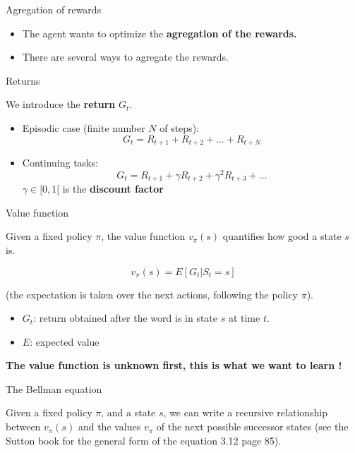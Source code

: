 \documentclass[usenames,dvipsnames,french]{beamer}
\begin{document}
\begin{frame}{Agregation of rewards}
   \begin{itemize}
       \item The agent wants to optimize the \textbf{{agregation of the rewards.}} 
	\item There are several ways to agregate the rewards.
   \end{itemize} 
\end{frame}

\begin{frame}{Returns}

    We introduce the \textbf{return} $G_t$.

    \begin{itemize}
	\item Episodic case (finite number $N$ of steps):
	    \begin{equation}
		G_t = R_{t+1} + R_{t+2} + \dots + R_{t+N}
	    \end{equation}
	\item Continuing tasks:
	    \begin{equation}
		G_t = R_{t+1} + \gamma R_{t+2} + \gamma^2 R_{t+3} + \dots 
	    \end{equation}
	    $\gamma \in [0,1[$ is the \textbf{{discount factor}}
    \end{itemize}

\end{frame}

\begin{frame}{Value function}

    Given a fixed policy $\pi$, the value function $v_{\pi}(s)$ quantifies how good a state $s$ is.

    \begin{equation}
	v_{\pi}(s) = E[G_t|S_t=s]
    \end{equation}

    (the expectation is taken over the next actions, following the policy $\pi$).
    \begin{itemize}
        \item $G_t$: return obtained after the word is in state $s$ at time $t$.
	\item $E$: expected value
    \end{itemize}

    \textbf{The value function is unknown first, this is what we want to learn !}

\end{frame}

\begin{frame}{The Bellman equation}

    Given a fixed policy $\pi$, and a state $s$, we can write a recursive relationship between 
    $v_{\pi}(s)$ and the values $v_{\pi}$ of the next possible successor states (see the Sutton book for the general form 
    of the equation 3.12 page 85).

\end{frame}
\end{document}
